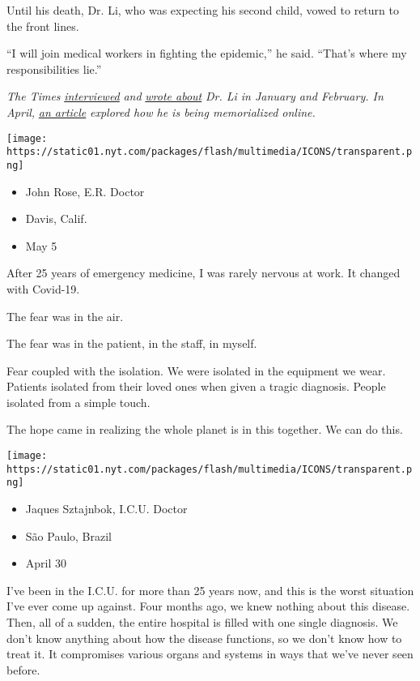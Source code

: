Until his death, Dr. Li, who was expecting his second child, vowed to
return to the front lines.

``I will join medical workers in fighting the epidemic,'' he said.
``That's where my responsibilities lie.''

\emph{The Times}
\emph{\href{https://www.nytimes.com/2020/02/07/world/asia/Li-Wenliang-china-coronavirus.html}{interviewed}}
\emph{and}
\emph{\href{https://www.nytimes.com/2020/02/01/world/asia/china-coronavirus.html}{wrote
about}} \emph{Dr. Li in January and February. In April,}
\emph{\href{https://www.nytimes.com/interactive/2020/04/13/technology/coronavirus-doctor-whistleblower-weibo.html}{an
article}} \emph{explored how he is being memorialized online.}

\texttt{[image: https://static01.nyt.com/packages/flash/multimedia/ICONS/transparent.png]}

\begin{itemize}
\tightlist
\item
  John Rose, E.R. Doctor
\item
  Davis, Calif.
\item
  May 5
\end{itemize}

After 25 years of emergency medicine, I was rarely nervous at work. It
changed with Covid-19.

The fear was in the air.

The fear was in the patient, in the staff, in myself.

Fear coupled with the isolation. We were isolated in the equipment we
wear. Patients isolated from their loved ones when given a tragic
diagnosis. People isolated from a simple touch.

The hope came in realizing the whole planet is in this together. We can
do this.

\texttt{[image: https://static01.nyt.com/packages/flash/multimedia/ICONS/transparent.png]}

\begin{itemize}
\tightlist
\item
  Jaques Sztajnbok, I.C.U. Doctor
\item
  São Paulo, Brazil
\item
  April 30
\end{itemize}

I've been in the I.C.U. for more than 25 years now, and this is the
worst situation I've ever come up against. Four months ago, we knew
nothing about this disease. Then, all of a sudden, the entire hospital
is filled with one single diagnosis. We don't know anything about how
the disease functions, so we don't know how to treat it. It compromises
various organs and systems in ways that we've never seen before.

